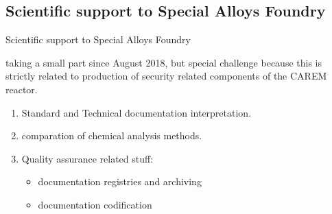 \subsection{Scientific support to Special Alloys Foundry}

\begin{frame}{Scientific support to Special Alloys Foundry}
\begin{block}
  
  taking a small part since August 2018, but special challenge because this is 
  strictly related to production of security related components of the CAREM 
  reactor. 
\end{block}
  \begin{enumerate}
    \item[] Standard and Technical documentation interpretation.
    \item[] comparation of chemical analysis methods.
    \item[] Quality assurance related stuff: 
      \begin{itemize}
	  \item documentation registries and archiving
	    \item documentation codification
      \end{itemize} 
  \end{enumerate}
\end{frame}

